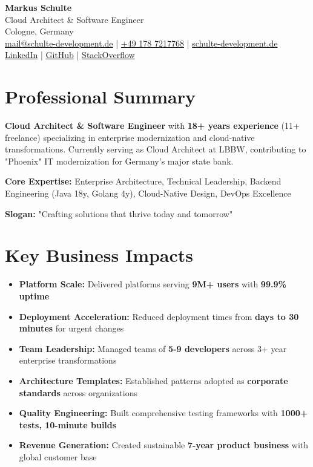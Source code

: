\documentclass[10pt,a4paper]{article}
\begin{document}
{\huge\sffamily\bfseries\color{primaryblue} Markus Schulte} \\[2pt]
{\Large\sffamily Cloud Architect \& Software Engineer} \\[4pt]
{\color{secondaryblue} Cologne, Germany} \\[2pt]
\href{mailto:mail@schulte-development.de}{mail@schulte-development.de} | 
\href{tel:+4917872177768}{+49 178 7217768} | 
\href{https://schulte-development.de}{schulte-development.de} \\
\href{https://linkedin.com/in/markus-schulte}{LinkedIn} | 
\href{https://github.com/SchulteDev}{GitHub} | 
\href{https://stackoverflow.com/users/1645517/markus-schulte}{StackOverflow}

\section{Professional Summary}

\textbf{Cloud Architect \& Software Engineer} with \textbf{18+ years experience} (11+ freelance) specializing in enterprise modernization and cloud-native transformations. Currently serving as Cloud Architect at LBBW, contributing to "Phoenix" IT modernization for Germany's major state bank.

\textbf{Core Expertise:} Enterprise Architecture, Technical Leadership, Backend Engineering (Java 18y, Golang 4y), Cloud-Native Design, DevOps Excellence

\textbf{Slogan:} "Crafting solutions that thrive today and tomorrow"

\section{Key Business Impacts}

\begin{itemize}[leftmargin=*,noitemsep,topsep=0pt]
\item \textbf{Platform Scale:} Delivered platforms serving \textbf{9M+ users} with \textbf{99.9\% uptime}
\item \textbf{Deployment Acceleration:} Reduced deployment times from \textbf{days to 30 minutes} for urgent changes
\item \textbf{Team Leadership:} Managed teams of \textbf{5-9 developers} across 3+ year enterprise transformations
\item \textbf{Architecture Templates:} Established patterns adopted as \textbf{corporate standards} across organizations
\item \textbf{Quality Engineering:} Built comprehensive testing frameworks with \textbf{1000+ tests, 10-minute builds}
\item \textbf{Revenue Generation:} Created sustainable \textbf{7-year product business} with global customer base
\end{itemize}
\end{document}
